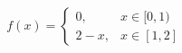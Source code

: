 \documentclass[preview]{standalone}
\begin{document}
\begin{align*}
f\left( x\right) =\begin{cases}0, & x \in [0, 1) \\ 2-x, & x \in [1,2] \end{cases}
\end{align*}
\end{document}
